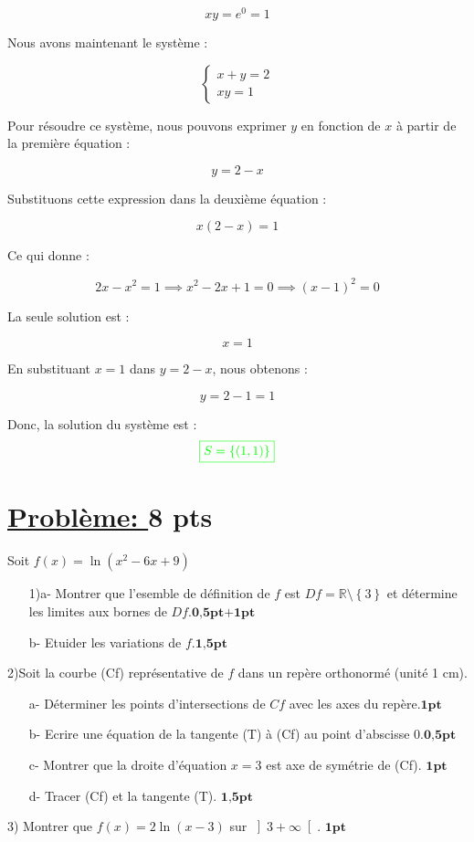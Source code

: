 \documentclass[12pt]{article}
\begin{document}
\[
xy = e^0 = 1
\]

Nous avons maintenant le système :

\[
\begin{cases}
x + y = 2 \\
xy = 1
\end{cases}
\]

Pour résoudre ce système, nous pouvons exprimer \(y\) en fonction de \(x\) à partir de la première équation :

\[
y = 2 - x
\]

Substituons cette expression dans la deuxième équation :

\[
x(2 - x) = 1
\]

Ce qui donne :

\[
2x - x^2 = 1 \implies x^2 - 2x + 1 = 0 \implies (x - 1)^2 = 0
\]

La seule solution est :

\[
x = 1
\]

En substituant \(x = 1\) dans \(y = 2 - x\), nous obtenons :

\[
y = 2 - 1 = 1
\]

Donc, la solution du système est :
\[
\textcolor{green}{\boxed{S=\left\lbrace (1, 1)\right\rbrace }}
\]
\section*{\underline{Problème: }\textbf{8 pts}}
Soit $f(x)=\ln(x^{2}-6x+9)$
\begin{itemize}
\item[1)a-] Montrer que l'esemble de définition de $f$ est $Df=\mathbb{R}\setminus\left\lbrace 3 \right\rbrace $ et détermine les limites aux bornes de $Df$.$\textbf{0,5pt+1pt}$

\item[b-] Etuider les variations de $f$.$\textbf{1,5pt}$
\end{itemize}

2)Soit la courbe (Cf) représentative de $f$ dans un repère orthonormé (unité 1 cm).
\begin{itemize}
\item[a-]Déterminer les points d'intersections de $Cf$ avec les axes du repère.$\textbf{1pt}$

\item[b-]Ecrire une équation de la tangente (T) à (Cf) au point d'abscisse 0.$\textbf{0,5pt}$

\item[c-]Montrer que la droite d'équation $x=3$ est axe de  symétrie de (Cf). $\textbf{1pt}$

\item[d-]Tracer (Cf) et la tangente (T). $\textbf{1,5pt}$
\end{itemize}
3) Montrer que $f(x)=2\ln(x-3)$ sur $ \left]3 +\infty \right[ $. $\textbf{1pt}$
\end{document}
